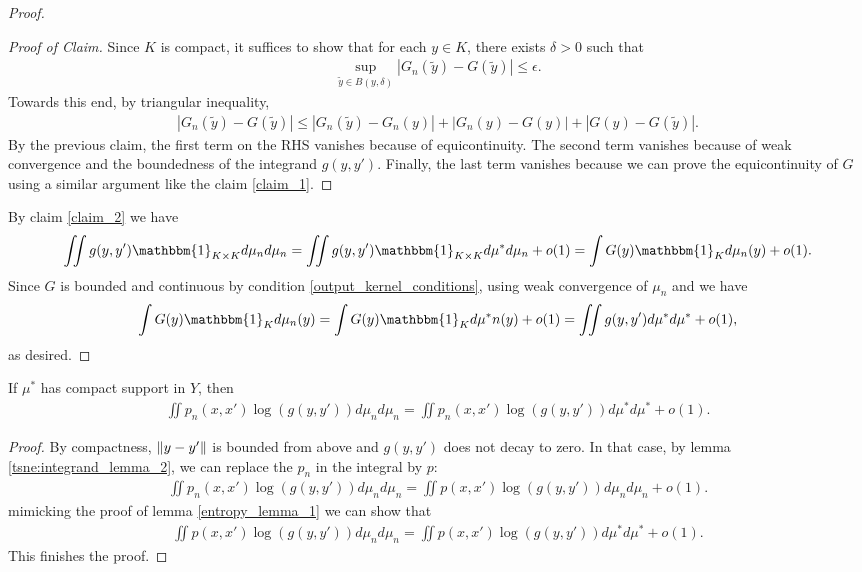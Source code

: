 \begin{proof}
    \begin{proof}[Proof of Claim]
        Since $K$ is compact, it suffices to show that for each $y \in K$, there exists $\delta>0$ such that
        \begin{align}
            \sup_{\tilde{y}\in B(y,\delta)} |G_n(\tilde{y})-G(\tilde{y})| \leq \epsilon.
        \end{align}
        Towards this end, by triangular inequality,
        \begin{align}
            |G_n(\tilde{y})-G(\tilde{y})| \leq |G_n(\tilde{y})-G_n(y)|+|G_n(y)-G(y)|+|G(y)-G(\tilde{y})|.
        \end{align}
        By the previous claim, the first term on the RHS vanishes because of equicontinuity. The second term vanishes because of weak convergence and the boundedness of the integrand $g(y,y')$. Finally, the last term vanishes because we can prove the equicontinuity of $G$ using a similar argument like the claim \ref{claim_1}.
    \end{proof}
    By claim \ref{claim_2} we have
    \begin{align}
        \iint g(y,y') \mathbbm{1}_{K \times K} d\mu_n d\mu_n = \iint g(y,y') \mathbbm{1}_{K \times K} d\mu^* d\mu_n +o(1) = \int G(y) \mathbbm{1}_K d\mu_n(y)+o(1).
    \end{align}
    Since $G$ is bounded and continuous by condition \ref{output_kernel_conditions}, using weak convergence of $\mu_n$ and we have
    \begin{align}
        \int G(y) \mathbbm{1}_K d\mu_n(y) = \int G(y) \mathbbm{1}_K d\mu^*n(y) + o(1) = \iint g(y,y')d\mu^* d\mu^* + o(1),
    \end{align}
    as desired.
\end{proof}
\begin{lemma}
    If $\mu^*$ has compact support in $Y$, then
    \begin{align}
        \iint p_n(x,x') \log(g(y,y')) d\mu_n d\mu_n = \iint p_n(x,x') \log(g(y,y')) d\mu^* d\mu^* +o(1).
    \end{align}
\end{lemma}
\begin{proof}
    By compactness, $\left\lVert y-y'\right\rVert$ is bounded from above and $g(y,y')$ does not decay to zero. In that case, by lemma \ref{tsne:integrand_lemma_2}, we can replace the $p_n$ in the integral by $p$:
    \begin{align}
        \iint p_n(x,x') \log(g(y,y')) d\mu_n d\mu_n = \iint p(x,x') \log(g(y,y')) d\mu_n d\mu_n + o(1).
    \end{align}
    mimicking the proof of lemma \ref{entropy_lemma_1} we can show that
    \begin{align}
        \iint p(x,x') \log(g(y,y')) d\mu_n d\mu_n = \iint p(x,x') \log(g(y,y')) d\mu^* d\mu^* + o(1).
    \end{align}
    This finishes the proof.
\end{proof}
